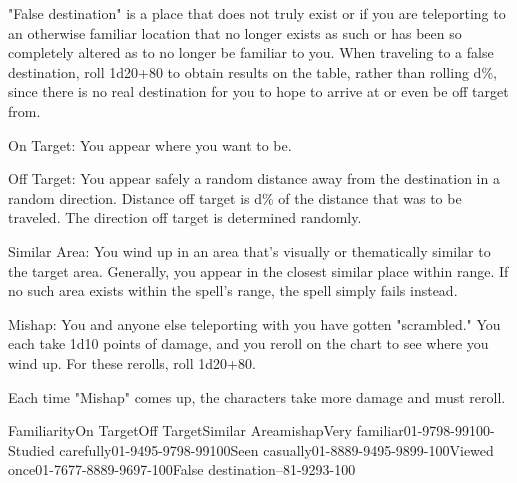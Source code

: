 {"False destination" is a place that does not truly exist or if you are teleporting to an otherwise familiar location that no longer exists as such or has been so completely altered as to no longer be familiar to you. When traveling to a false destination, roll 1d20+80 to obtain results on the table, rather than rolling d\%, since there is no real destination for you to hope to arrive at or even be off target from.

On Target: You appear where you want to be.

Off Target: You appear safely a random distance away from the destination in a random direction. Distance off target is d\% of the distance that was to be traveled. The direction off target is determined randomly.

Similar Area: You wind up in an area that's visually or thematically similar to the target area. Generally, you appear in the closest similar place within range. If no such area exists within the spell's range, the spell simply fails instead.

Mishap: You and anyone else teleporting with you have gotten "scrambled." You each take 1d10 points of damage, and you reroll on the chart to see where you wind up. For these rerolls, roll 1d20+80.

Each time "Mishap" comes up, the characters take more damage and must reroll.

 FamiliarityOn TargetOff TargetSimilar AreamishapVery familiar01-9798-99100-Studied carefully01-9495-9798-99100Seen casually01-8889-9495-9899-100Viewed once01-7677-8889-9697-100False destination--81-9293-100 }
        
